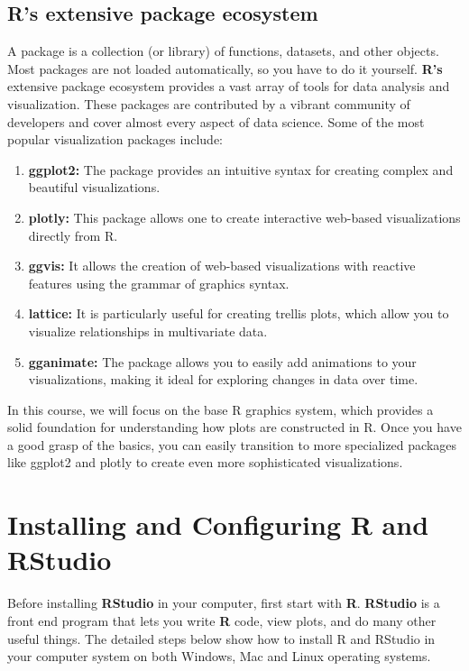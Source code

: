 \documentclass[
]{book}
\providecommand{\tightlist}{%
  \setlength{\itemsep}{0pt}\setlength{\parskip}{0pt}}
\begin{document}
\subsection{R's extensive package ecosystem}\label{rs-extensive-package-ecosystem}

A package is a collection (or library) of functions, datasets, and other objects. Most packages are not loaded automatically, so you have to do it yourself. \textbf{R's} extensive package ecosystem provides a vast array of tools for data analysis and visualization. These packages are contributed by a vibrant community of developers and cover almost every aspect of data science. Some of the most popular visualization packages include:

\begin{enumerate}
\def\labelenumi{\roman{enumi})}
\tightlist
\item
  \textbf{ggplot2:} The package provides an intuitive syntax for creating complex and beautiful visualizations.
\item
  \textbf{plotly:} This package allows one to create interactive web-based visualizations directly from R.
\item
  \textbf{ggvis:} It allows the creation of web-based visualizations with reactive features using the grammar of graphics syntax.
\item
  \textbf{lattice:} It is particularly useful for creating trellis plots, which allow you to visualize relationships in multivariate data.
\item
  \textbf{gganimate:} The package allows you to easily add animations to your visualizations, making it ideal for exploring changes in data over time.
\end{enumerate}

In this course, we will focus on the base R graphics system, which provides a solid foundation for understanding how plots are constructed in R. Once you have a good grasp of the basics, you can easily transition to more specialized packages like ggplot2 and plotly to create even more sophisticated visualizations.

\section{Installing and Configuring R and RStudio}\label{installing-and-configuring-r-and-rstudio}

Before installing \textbf{RStudio} in your computer, first start with \textbf{R}. \textbf{RStudio} is a front end program that lets you write \textbf{R} code, view plots, and do many other useful things. The detailed steps below show how to install R and RStudio in your computer system on both Windows, Mac and Linux operating systems.
\end{document}
